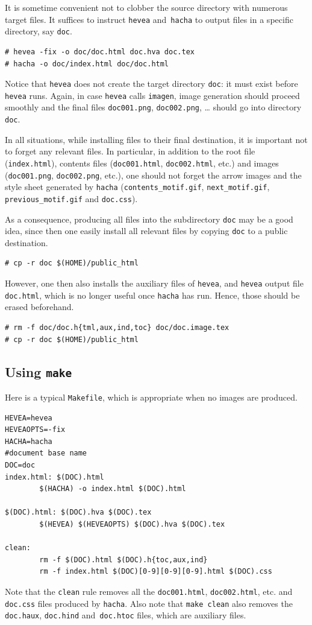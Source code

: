 It is sometime convenient not to clobber the source directory with
numerous target files.
It suffices to instruct
\texttt{hevea} and~\texttt{hacha} to output files in a
specific directory, say \texttt{doc}.
\begin{verbatim}
# hevea -fix -o doc/doc.html doc.hva doc.tex
# hacha -o doc/index.html doc/doc.html
\end{verbatim}
Notice that \texttt{hevea} does not create the target directory
\texttt{doc}: it must exist before \texttt{hevea} runs.
Again, in case \texttt{hevea} calls \texttt{imagen},
image generation should proceed smoothly and the final files
\texttt{doc001.png}, \texttt{doc002.png}, \ldots{} should go into
directory \texttt{doc}.


In all situations, while installing files to their final destination,
it is important not to forget any relevant files.
In particular, in addition to the root file
(\texttt{index.html}), contents files (\texttt{doc001.html},
\texttt{doc002.html}, etc.) and images
(\texttt{doc001.png}, \texttt{doc002.png}, etc.),
one should not forget the arrow images and the
style sheet generated by \texttt{hacha}
(\texttt{contents\_motif.gif}, \texttt{next\_motif.gif},
\texttt{previous\_motif.gif} and \texttt{doc.css}).

As a consequence, producing all files into the subdirectory
\texttt{doc} may be a good idea, since then one easily install all
relevant files by copying \texttt{doc} to a public destination.
\begin{verbatim}
# cp -r doc $(HOME)/public_html
\end{verbatim}
However, one then also installs the auxiliary files of \texttt{hevea},
and \texttt{hevea} output file \texttt{doc.html}, which is no longer
useful once \texttt{hacha} has run.
Hence, those should be erased beforehand.
\begin{verbatim}
# rm -f doc/doc.h{tml,aux,ind,toc} doc/doc.image.tex
# cp -r doc $(HOME)/public_html
\end{verbatim}


\subsection{Using \label{makefile}\texttt{make}}

Here is a typical \texttt{Makefile}, which is appropriate when
no images are produced.
\begin{verbatim}
HEVEA=hevea
HEVEAOPTS=-fix
HACHA=hacha
#document base name
DOC=doc
index.html: $(DOC).html
        $(HACHA) -o index.html $(DOC).html

$(DOC).html: $(DOC).hva $(DOC).tex
        $(HEVEA) $(HEVEAOPTS) $(DOC).hva $(DOC).tex

clean:
        rm -f $(DOC).html $(DOC).h{toc,aux,ind}
        rm -f index.html $(DOC)[0-9][0-9][0-9].html $(DOC).css
\end{verbatim}
Note that the \texttt{clean} rule removes all the \texttt{doc001.html},
\texttt{doc002.html}, etc. and \texttt{doc.css} files produced by
\texttt{hacha}.
Also note that \texttt{make clean} also removes the
\texttt{doc.haux}, \texttt{doc.hind} and~\texttt{doc.htoc} files, which are \hevea{}
auxiliary files.

